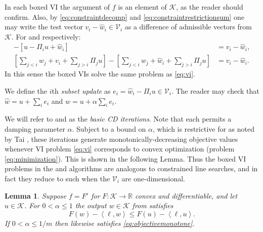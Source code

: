 \documentclass[letterpaper,final,12pt,reqno]{amsart}
\theoremstyle{cstyle}
\newtheorem{lemma}[theorem]{Lemma}
\theoremstyle{cstyle*}
\theoremstyle{dstyle}
\numberwithin{equation}{section}
\numberwithin{figure}{section}
\numberwithin{table}{section}
\numberwithin{theorem}{section}
\newcommand{\RR}{\mathbb{R}}
\newcommand{\cK}{\mathcal{K}}
\newcommand{\cV}{\mathcal{V}}
\newcommand{\ip}[2]{\left<#1,#2\right>}
\begin{document}
In each boxed VI the argument of $f$ is an element of $\cK$, as the reader should confirm.  Also, by \eqref{eq:constraintdecomp} and \eqref{eq:constraintrestrictionsum} one may write the test vector $v_i - \hat w_i \in \cV_i$ as a difference of admissible vectors from $\cK$.  For  and  respectively:
\begin{align}
[u - \Pi_i u + v_i] - [u - \Pi_i u + \hat w_i] &= v_i - \hat w_i, \label{eq:admissibledifferenceadd} \\
\left[\sum_{j<i} w_j + v_i + \sum_{j>i} \Pi_j u\right] - \left[\sum_{j<i} w_j + \hat w_i + \sum_{j>i} \Pi_j u\right] &= v_i - \hat w_i.  \label{eq:admissibledifferencemult}
\end{align}
In this sense the boxed VIs solve the same problem as \eqref{eq:vi}.

We define the $i$th \emph{subset update} as $e_i = \hat w_i - \Pi_i u \in \cV_i$.  The reader may check that $\hat w = u + \sum_{i} e_i$ and $w = u + \alpha \sum_i e_i$.

We will refer to  and  as the \emph{basic CD iterations}.  Note that each permits a damping parameter $\alpha$.  Subject to a bound on $\alpha$, which is restrictive for  as noted by Tai \cite{Tai2003}, these iterations generate monotonically-decreasing objective values whenever VI problem \eqref{eq:vi} corresponds to convex optimization (problem \eqref{eq:minimization}).  This is shown in the following Lemma.  Thus the boxed VI problems in the  and  algorithms are analogous to constrained line searches, and in fact they reduce to such when the $\cV_i$ are one-dimensional.

\begin{lemma}  Suppose $f=F'$ for $F:\cK\to\RR$ convex and differentiable, and let $u\in\cK$.  For $0<\alpha\le 1$ the output $w \in \cK$ from  satisfies
\begin{equation}
F(w) - \ip{\ell}{w} \le F(u) - \ip{\ell}{u}.  \label{eq:objectivemonotone}
\end{equation}
If $0 < \alpha \le 1/m$ then  likewise satisfies \eqref{eq:objectivemonotone}.
\end{lemma}
\end{document}
